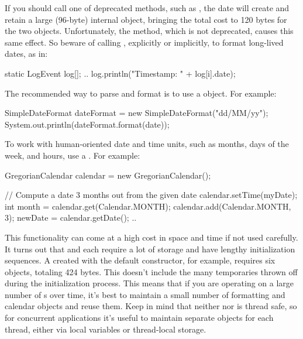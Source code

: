 If you should call one of  deprecated methods, such as
, the date will create and retain
a large (96-byte) internal object, bringing the total cost to 120 bytes for
the two objects. Unfortunately, the  method, which is not
deprecated, causes this same effect. So beware of calling ,
explicitly or implicitly, to format long-lived dates, as in:

\begin{shortlisting}
	static LogEvent log[]; 
	..
	log.println("Timestamp: " + log[i].date);
\end{shortlisting}

The recommended way to parse and format  is 
to use a  object. For example:

\begin{shortlisting}
    SimpleDateFormat dateFormat =  new SimpleDateFormat("dd/MM/yy"); 
    System.out.println(dateFormat.format(date)); 
\end{shortlisting}

To work with human-oriented date and time units, such as
months, days of the week, and hours, use a . For example:

\begin{shortlisting}

	GregorianCalendar calendar = new GregorianCalendar();
	
	// Compute a date 3 months out from the given date
    calendar.setTime(myDate);
	int month = calendar.get(Calendar.MONTH); 
	calendar.add(Calendar.MONTH, 3); 
	newDate = calendar.getDate();
	..
    
\end{shortlisting}

This functionality can come at a high cost in space and time if not
used carefully. It turns out that  and
 each require a lot of storage and have lengthy
initialization sequences.
A  created with the default constructor, for
example, requires six objects, totaling 424 bytes. This doesn't include the many
temporaries thrown off during the initialization process.  This means that if
you are operating on a large number of s over time, it's best to maintain a small number of
formatting and calendar objects and reuse them.  Keep in mind that neither
 nor  is thread safe, so for
concurrent applications it's useful to maintain separate objects for each
thread, either via local variables or thread-local storage.

